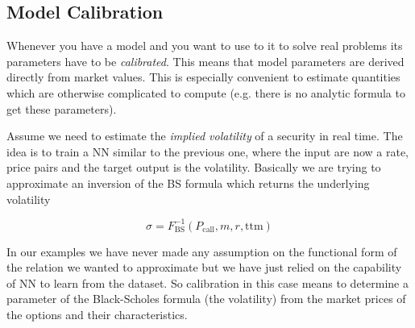 \subsection{Model Calibration}\label{model-calibration}

Whenever you have a model and you want to use to it to solve real problems its parameters have to be \emph{calibrated}. This means that model parameters are derived directly from market values. This is especially convenient to estimate quantities which are otherwise complicated to compute (e.g. there is no analytic formula to get these parameters).

Assume we need to estimate the \emph{implied volatility} of a security in real time. The idea is to train a NN similar to the previous one, where the input are now a rate, price pairs and the target output is the volatility. Basically we are trying to approximate an inversion of the BS formula which returns the underlying volatility

\begin{equation} 
\sigma = F^{-1}_\textrm{BS}(P_\textrm{call}, m, r, \mathrm{ttm})
\end{equation}

In our examples we have never made any assumption on the functional form of the relation we wanted to approximate but we have just relied on the capability of NN to learn from the dataset. 
So calibration in this case means to determine a parameter of the Black-Scholes formula (the volatility) from the market prices of the options and their characteristics.

